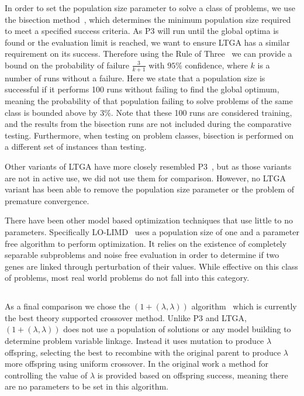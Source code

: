 \documentclass{sig-alternate}
\begin{document}
In order to set the population size parameter to solve a class of problems, we use
the bisection method~\cite{goldman:2012:ltga}, which determines the minimum population
size required to meet a specified success criteria.  As P3 will run until the global optima
is found or the evaluation limit is reached, we want to ensure LTGA has a similar requirement
on its success.  Therefore using the Rule of Three~\cite{jovanovic:1997:ruleofthree} we
can provide a bound on the probability of failure $\frac{3}{k+1}$ with $95\%$ confidence,
where $k$ is a number of runs without a failure.  Here we state that a population size
is successful if it performs 100 runs without failing to find the global optimum, meaning
the probability of that population failing to solve problems of the same class is bounded above by
$3\%$.  Note that these 100 runs are considered training, and the results from the bisection
runs are not included during the comparative testing.  Furthermore, when testing on problem
classes, bisection is performed on a different set of instances than testing.

Other variants of LTGA have more closely resembled P3~\cite{goldman:2012:ltga},
but as those variants are not in active use, we did not use them for comparison.
However, no LTGA variant has been able to remove the population size parameter
or the problem of premature convergence.

There have been other model based optimization techniques that use little to
no parameters.  Specifically LO-LIMD~\cite{posik:2011:parameterless} uses a
population size of one and a parameter free algorithm to perform optimization.
It relies on the existence of completely separable subproblems and noise free evaluation in order to determine
if two genes are linked through perturbation of their values.  While effective on
this class of problems, most real world problems do not fall into this category.

\subsection{}
As a final comparison we chose the $(1+(\lambda,\lambda))$ algorithm~\cite{doerr:2013:lambdalambda}
which is currently the best theory supported crossover method.  Unlike P3 and LTGA,
$(1+(\lambda,\lambda))$ does not use a population of solutions or any model building
to determine problem variable linkage.  Instead it uses mutation to produce $\lambda$
offspring, selecting the best to recombine with the original parent to produce $\lambda$
more offspring using uniform crossover.  In the original work a method for controlling
the value of $\lambda$ is provided based on offspring success, meaning there are no
parameters to be set in this algorithm.
\end{document}
